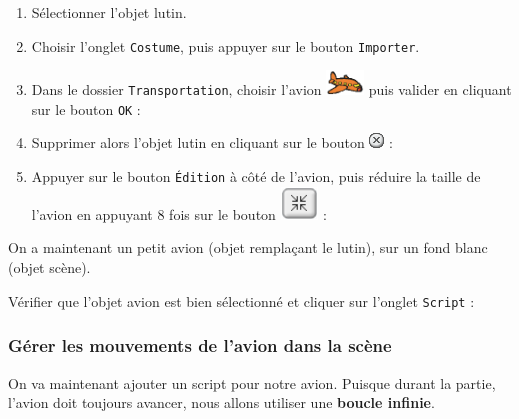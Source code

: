 \begin{enumerate}
\item Sélectionner l'objet lutin.
\item Choisir l'onglet \texttt{Costume}, puis appuyer sur le bouton \texttt{Importer}.
\item Dans le dossier \texttt{Transportation}, choisir l'avion \includegraphics[width=1cm]{./images/scratch/Avion} puis valider en cliquant sur le bouton \texttt{OK} :
\item Supprimer alors l'objet lutin en cliquant sur le bouton \includegraphics[width=.7cm]{./images/scratch/Supprimer} :
\item Appuyer sur le bouton \texttt{Édition} à côté de l'avion, puis réduire la taille de l'avion en appuyant 8 fois sur le bouton \includegraphics[width=1cm]{./images/scratch/Reduire} :
\end{enumerate}
On a maintenant un petit avion (objet remplaçant le lutin), sur un fond blanc (objet scène).

Vérifier que l'objet avion est bien sélectionné et cliquer sur l'onglet \texttt{Script} :







\subsubsection{Gérer les mouvements de l'avion dans la scène}  

On va maintenant ajouter un script pour notre avion. Puisque durant la partie, l'avion doit toujours avancer, nous allons utiliser une \textbf{boucle infinie}.

\vspace{12pt}

